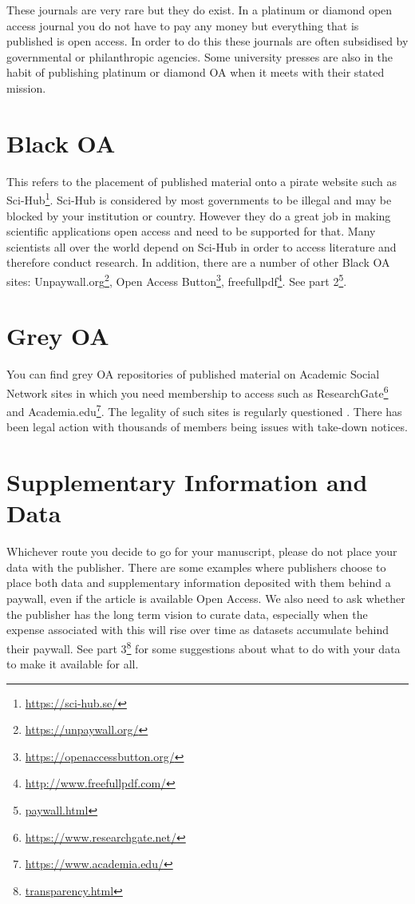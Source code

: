 \documentclass[
]{krantz}
\renewcommand{\href}[2]{#2\footnote{\url{#1}}}
\begin{document}
These journals are very rare but they do exist. In a platinum or diamond open access journal you do not have to pay any money but everything that is published is open access. In order to do this these journals are often subsidised by governmental or philanthropic agencies. Some university presses are also in the habit of publishing platinum or diamond OA when it meets with their stated mission.

\hypertarget{black-oa}{%
\section{Black OA}\label{black-oa}}

This refers to the placement of published material onto a pirate website such as \href{https://sci-hub.se/}{Sci-Hub}. Sci-Hub is considered by most governments to be illegal and may be blocked by your institution or country. However they do a great job in making scientific applications open access and need to be supported for that. Many scientists all over the world depend on Sci-Hub in order to access literature and therefore conduct research. In addition, there are a number of other Black OA sites: \href{https://unpaywall.org/}{Unpaywall.org}, \href{https://openaccessbutton.org/}{Open Access Button}, \href{http://www.freefullpdf.com/}{freefullpdf}. \href{paywall.html}{See part 2}.

\hypertarget{grey-oa}{%
\section{Grey OA}\label{grey-oa}}

You can find grey OA repositories of published material on Academic Social Network sites in which you need membership to access such as \href{https://www.researchgate.net/}{ResearchGate} and \href{https://www.academia.edu/}{Academia.edu}. The legality of such sites is regularly questioned \citep[see][ for more details]{piwowar2018state}. There has been legal action with thousands of members being issues with take-down notices.

\hypertarget{supplementary-information-and-data}{%
\section{Supplementary Information and Data}\label{supplementary-information-and-data}}

Whichever route you decide to go for your manuscript, please do not place your data with the publisher. There are some examples where publishers choose to place both data and supplementary information deposited with them behind a paywall, even if the article is available Open Access. We also need to ask whether the publisher has the long term vision to curate data, especially when the expense associated with this will rise over time as datasets accumulate behind their paywall. \href{transparency.html}{See part 3} for some suggestions about what to do with your data to make it available for all.
\end{document}
